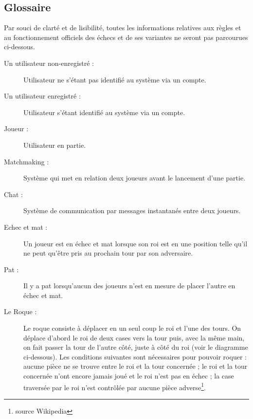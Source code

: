 \documentclass[10pt, a4paper]{article}
\begin{document}
		\subsection{Glossaire} Par souci de clarté et de lisibilité, toutes les informations relatives aux règles et au fonctionnement officiels des échecs et de ses variantes ne seront pas parcourues ci-dessous.
		\begin{description}
		\item[Un utilisateur non-enregistré :] Utilisateur ne s'étant pas identifié au système via un compte.
		\item[Un utilisateur enregistré :] Utilisateur s'étant identifié au système via un compte.
		\item[Joueur :] Utilisateur en partie.
		\item[Matchmaking :] Système qui met en relation deux joueurs avant le lancement d'une partie.
		\item[Chat :] Système de communication par messages instantanés entre deux joueurs.
		\item[Echec et mat :] Un joueur est en échec et mat lorsque son roi est en une position telle qu'il ne peut qu'être pris au prochain tour par son adversaire.
		\item[Pat :] Il y a pat lorsqu'aucun des joueurs n'est en mesure de placer l'autre en échec et mat.
		\item[Le Roque :] Le roque consiste à déplacer en un seul coup le roi et l'une des tours. On déplace d'abord le roi de deux cases vers la tour puis, avec la même main, on fait passer la tour de l'autre côté, juste à côté du roi (voir le diagramme ci-dessous). Les conditions suivantes sont nécessaires pour pouvoir roquer : aucune pièce ne se trouve entre le roi et la tour concernée ; le roi et la tour concernée n'ont encore jamais joué et le roi n'est pas en échec ;
la case traversée par le roi n'est contrôlée par aucune pièce adverse\footnote{source Wikipedia}.

\end{description}
\end{document}

